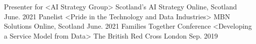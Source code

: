 

\begin{cventries}

  \cventry
    {Presenter for <AI Strategy Group>} %
    {Scotland's AI Strategy} %
    {Online, Scotland} %
    {June. 2021} %
    {}
\vspace{-10pt}
  \cventry
    {Panelist <Pride in the Technology and Data Industries>} %
    {MBN Solutions} %
    {Online, Scotland} %
    {June. 2021} %
    {}
\vspace{-10pt}
  \cventry
    {Families Together Conference <Developing a Service Model from Data> } %
    {The British Red Cross} %
    {London} %
    {Sep. 2019} %
    {}

\end{cventries}
